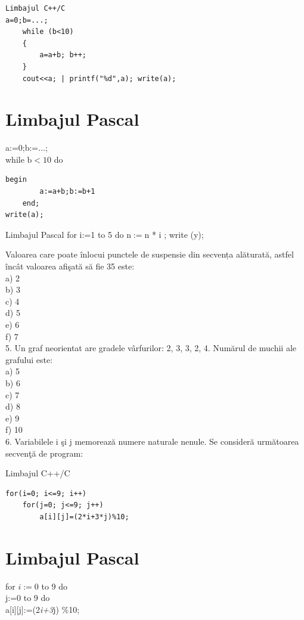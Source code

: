 \documentclass[10pt]{article}
\begin{document}
\begin{verbatim}
Limbajul C++/C
a=0;b=...;
    while (b<10)
    {
        a=a+b; b++;
    }
    cout<<a; | printf("%d",a); write(a);
\end{verbatim}

\section*{Limbajul Pascal}
a:=0;b:=...;\\
while $\mathrm{b}<10$ do

\begin{verbatim}
begin
        a:=a+b;b:=b+1
    end;
write(a);
\end{verbatim}

Limbajul Pascal for i:=1 to 5 do $\mathrm{n}:=\mathrm{n}$ * i ; write (y);

Valoarea care poate înlocui punctele de suspensie din secvența alăturată, astfel încât valoarea afişată să fie 35 este:\\
a) 2\\
b) 3\\
c) 4\\
d) 5\\
e) 6\\
f) 7\\
5. Un graf neorientat are gradele vârfurilor: 2, 3, 3, 2, 4. Numărul de muchii ale grafului este:\\
a) 5\\
b) 6\\
c) 7\\
d) 8\\
e) 9\\
f) 10\\
6. Variabilele i şi j memorează numere naturale nenule. Se consideră următoarea secvenţă de program:

Limbajul C++/C

\begin{verbatim}
for(i=0; i<=9; i++)
    for(j=0; j<=9; j++)
        a[i][j]=(2*i+3*j)%10;
\end{verbatim}

\section*{Limbajul Pascal}
\begin{displayquote}
for $i:=0$ to 9 do\\
j:=0 to 9 do\\[0pt]
a[i][j]:=(2\textit{i+3}j) \%10;
\end{displayquote}
\end{document}
